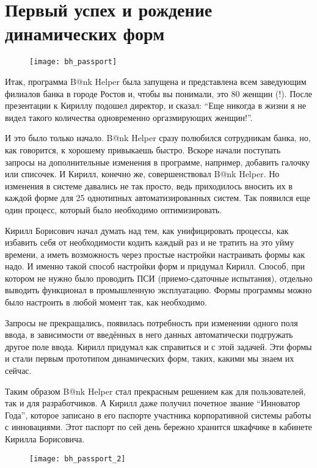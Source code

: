 \documentclass[../index.tex]{subfiles}
\begin{document}
\section{Первый успех и рождение динамических форм}

\begin{figure}[H]
	\texttt{[image: bh\_passport]}
	\centering
\end{figure}

Итак, программа B@nk Helper была запущена и представлена всем заведующим филиалов банка в городе Ростов и, чтобы вы понимали, это 80 женщин (!).
После презентации к Кириллу подошел директор, и сказал:
“Еще никогда в жизни я не видел такого количества одновременно оргазмирующих женщин!”.

И это было только начало. B@nk Helper сразу полюбился сотрудникам банка, но, как говорится, к хорошему привыкаешь быстро. Вскоре начали поступать запросы на дополнительные изменения в программе, например, добавить галочку или списочек. И Кирилл, конечно же,  совершенствовал B@nk Helper. Но изменения в системе давались не так просто, ведь приходилось вносить их в каждой форме для 25 однотипных автоматизированных систем. Так появился еще один процесс, который было необходимо оптимизировать.

Кирилл Борисович начал думать над тем, как унифицировать процессы, как избавить себя от необходимости кодить каждый раз и не тратить на это уйму времени, а иметь возможность через простые настройки настраивать формы как надо. И именно такой способ настройки форм и придумал Кирилл. Способ, при котором не нужно было проводить ПСИ (приемо-сдаточные испытания), отдельно выводить функционал в промышленную эксплуатацию.  Формы программы можно было настроить в любой момент так, как необходимо.

Запросы не прекращались, появилась потребность при изменении одного поля ввода, в зависимости от введённых в него данных автоматически подгружать другое поле ввода. Кирилл придумал как справиться и с этой задачей. Эти формы и стали первым прототипом динамических форм, таких, какими мы знаем их сейчас.

Таким образом B@nk Helper стал прекрасным решением как для пользователей, так и для разработчиков. А Кирилл даже получил почетное звание “Инноватор Года”, которое записано в его паспорте участника  корпоративной системы работы с инновациями. Этот паспорт по сей день  бережно хранится шкафчике в кабинете Кирилла Борисовича.

\begin{figure}[H]
	\texttt{[image: bh\_passport\_2]}
	\centering
\end{figure}
\end{document}
